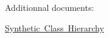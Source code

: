 Additionnal documents\+:
\begin{DoxyItemize}
\item \mbox{\hyperlink{group__grpSynthHierarchy}{Synthetic Class Hierarchy}} 
\end{DoxyItemize}